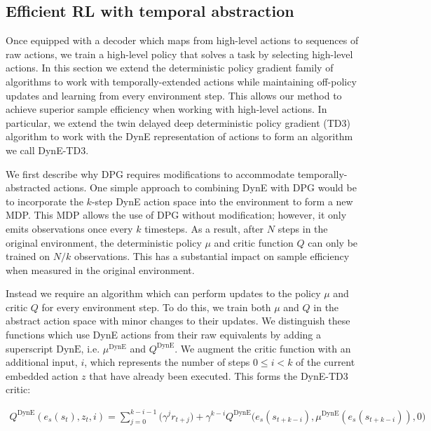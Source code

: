 \subsection{Efficient RL with temporal abstraction}

Once equipped with a decoder which maps from high-level actions to sequences of raw actions, we train a high-level policy that solves a task by selecting high-level actions.
In this section we extend the deterministic policy gradient \citep{silver2014deterministic} family of algorithms to work with temporally-extended actions while maintaining off-policy updates and learning from every environment step.
This allows our method to achieve superior sample efficiency when working with high-level actions.
In particular, we extend the twin delayed deep deterministic policy gradient (TD3) algorithm \citep{fujimoto2018addressing} to work with the DynE representation of actions to form an algorithm we call DynE-TD3.

We first describe why DPG requires modifications to accommodate temporally-abstracted actions. One simple approach to combining DynE with DPG would be to incorporate the $k$-step DynE action space into the environment to form a new MDP.
This MDP allows the use of DPG without modification; however, it only emits observations once every $k$ timesteps.
As a result, after $N$ steps in the original environment, the deterministic policy $\mu$ and critic function $Q$ can only be trained on $N/k$ observations.
This has a substantial impact on sample efficiency when measured in the original environment.

Instead we require an algorithm which can perform updates to the policy $\mu$ and critic $Q$ for every environment step.
To do this, we train both $\mu$ and $Q$ in the abstract action space with minor changes to their updates.
We distinguish these functions which use DynE actions from their raw equivalents by adding a superscript $\text{DynE}$, i.e. $\mu^{\text{DynE}}$ and $Q^{\text{DynE}}$.
We augment the critic function with an additional input, $i$, which represents the number of steps $0 \le i < k$ of the current embedded action $z$ that have already been executed.
This forms the DynE-TD3 critic:

\begin{align}
\label{eq:critic}
Q^{\text{DynE}}(e_s(s_t), z_t, i) = \sum_{j=0}^{k-i-1} \big( \gamma^j r_{t+j} \big) + \gamma^{k-i} Q^{\text{DynE}} \Big( e_s(s_{t+k-i}), \mu^{\text{DynE}}(e_s(s_{t+k-i})), 0 \Big)
\end{align}

